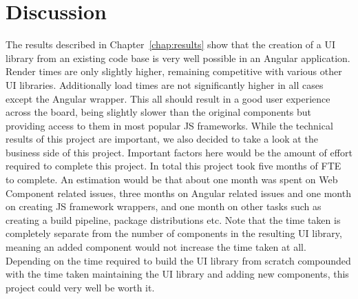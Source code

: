 \chapter{Discussion}

The results described in Chapter~\ref{chap:results} show that the creation of a UI library from an existing code base is very well possible in an Angular application. Render times are only slightly higher, remaining competitive with various other UI libraries. Additionally load times are not significantly higher in all cases except the Angular wrapper. This all should result in a good user experience across the board, being slightly slower than the original components but providing access to them in most popular JS frameworks.
While the technical results of this project are important, we also decided to take a look at the business side of this project. Important factors here would be the amount of effort required to complete this project. In total this project took five months of FTE to complete. An estimation would be that about one month was spent on Web Component related issues, three months on Angular related issues and one month on creating JS framework wrappers, and one month on other tasks such as creating a build pipeline, package distributions etc. Note that the time taken is completely separate from the number of components in the resulting UI library, meaning an added component would not increase the time taken at all. Depending on the time required to build the UI library from scratch compounded with the time taken maintaining the UI library and adding new components, this project could very well be worth it.
